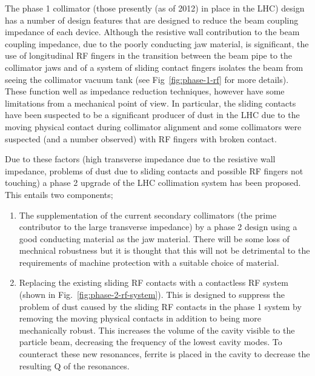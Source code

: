 The phase 1 collimator (those presently (as of 2012) in place in the LHC) design has a number of design features that are designed to reduce the beam coupling impedance of each device. Although the resistive wall contribution to the beam coupling impedance, due to the poorly conducting jaw material, is significant, the use of longitudinal RF fingers in the transition between the beam pipe to the collimator jaws and of a system of sliding contact fingers isolates the beam from seeing the collimator vacuum tank (see Fig~\ref{fig:phase-1-rf} for more details). These function well as impedance reduction techniques, however have some limitations from a mechanical point of view. In particular, the sliding contacts have been suspected to be a significant producer of dust in the LHC due to the moving physical contact during collimator alignment and some collimators were suspected (and a number observed) with RF fingers with broken contact. 

Due to these factors (high transverse impedance due to the resistive wall impedance, problems of dust due to sliding contacts and possible RF fingers not touching) a phase 2 upgrade of the LHC collimation system has been proposed. This entails two components;

\begin{enumerate}
\item{The supplementation of the current secondary collimators (the prime contributor to the large transverse impedance) by a phase 2 design using a good conducting material as the jaw material. There will be some loss of mechnical robustness but it is thought that this will not be detrimental to the requirements of machine protection with a suitable choice of material.}
\item{Replacing the existing sliding RF contacts with a contactless RF system (shown in Fig.~\ref{fig:phase-2-rf-system}). This is designed to suppress the problem of dust caused by the sliding RF contacts in the phase 1 system by removing the moving physical contacts in addition to being more mechanically robust. This increases the volume of the cavity visible to the particle beam, decreasing the frequency of the lowest cavity modes. To counteract these new resonances, ferrite is placed in the cavity to decrease the resulting Q of the resonances.}
\end{enumerate}


